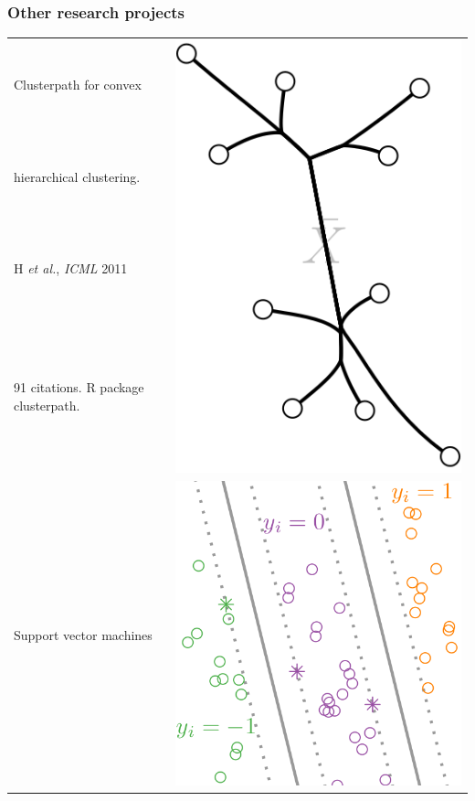 \documentclass{beamer}
\begin{document}
\begin{frame}
  \frametitle{Other research projects}
  \begin{tabular}{ll}
Clusterpath for convex & \multirow{4}{*}{
\includegraphics[height=0.2\textheight]{screenshot-clusterpath}
}\\
hierarchical clustering.\\
H {\it et al.}, {\it ICML} 2011\\
91 citations. R package clusterpath. \\
\hline
Support vector machines & \multirow{4}{*}{
\includegraphics[height=0.2\textheight]{screenshot-ranksvmcompare}
}
\end{tabular}
\end{frame}
\end{document}
